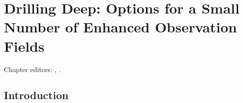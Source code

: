 \chapter[Deep Drilling Fields]{Drilling Deep: Options for a Small Number of Enhanced Observation
Fields}
\def\chpname{deepdrilling}\label{chp:\chpname}

Chapter editors:
,
.


\section{Introduction}
\label{sec:\chpname:intro}




% 


% 

